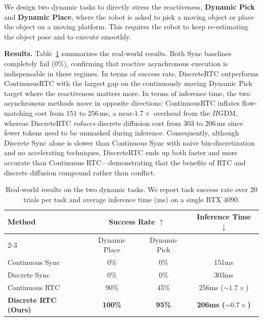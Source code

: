 \documentclass{article}
\begin{document}
We design two dynamic tasks to directly stress the reactiveness, \textbf{Dynamic Pick} and \textbf{Dynamic Place}, where the robot is asked to pick a moving object or place the object on a moving platform. This requires the robot to keep re-estimating the object pose and to execute smoothly.




\textbf{Results.}
Table~\ref{tab:real_results} summarizes the real-world results.
Both Sync baselines completely fail ($0\%$), confirming that reactive asynchronous execution is indispensable in these regimes.
In terms of success rate, DiscreteRTC outperforms ContinuousRTC with the largest gap on the continuously moving Dynamic Pick target where the reactiveness matters more.
In terms of inference time, the two asynchronous methods move in opposite directions: ContinuousRTC inflates flow-matching cost from $151$ to $256$\,ms, a near-$1.7\times$ overhead from the $\Pi$GDM, whereas DiscreteRTC \emph{reduces} discrete diffusion cost from $303$ to $206$\,ms since fewer tokens need to be unmasked during inference. Consequently, although Discrete Sync alone is slower than Continuous Sync with naive bin-discretization and no accelerating techniques, DiscreteRTC ends up both faster and more accurate than Continuous RTC---demonstrating that the benefits of RTC and discrete diffusion compound rather than conflict.

\begin{table}[t]
\centering
\caption{Real-world results on the two dynamic tasks. We report task success rate over 20 trials per task and average inference time (ms) on a single RTX 4090.}
\label{tab:real_results}
\begin{tabular}{lccc}
\toprule
\multirow{2}{*}{\textbf{Method}} & \multicolumn{2}{c}{\textbf{Success Rate} $\uparrow$}  & \multirow{2}{*}{\textbf{Inference Time} $\downarrow$} \\
\cmidrule(lr){2-3}
& Dynamic Place & Dynamic Pick & \\
\midrule
Continuous Sync                   & 0\%           & 0\%            & 151ms \\
Discrete Sync                     & 0\%           & 0\%            & 303ms \\
\midrule
Continuous RTC                    & 90\%          & 45\%           & 256ms ($\sim1.7 \times$) \\
\textbf{Discrete RTC (Ours)}       & \textbf{100\%} & \textbf{95\%} & \textbf{206ms ($\sim0.7 \times$)} \\
\bottomrule

\end{tabular}
\vskip -0.1in
\end{table}
\end{document}
